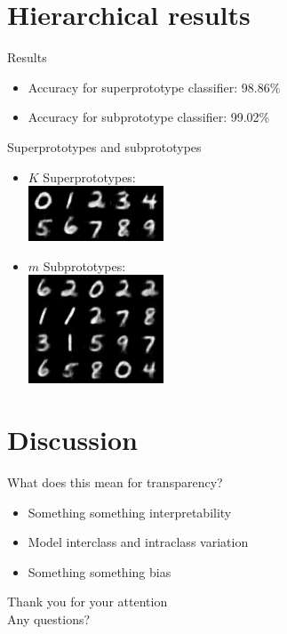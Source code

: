 \documentclass{beamer}[169]
\begin{document}
\section{Hierarchical results}
\begin{frame}{Results}
\begin{itemize}
    \item Accuracy for superprototype classifier: 98.86\% %
    \item Accuracy for subprototype classifier:  99.02\%
\end{itemize}
\end{frame}
\begin{frame}{Superprototypes and subprototypes}
\begin{itemize}
 \item $K$ Superprototypes:\\   \includegraphics[scale=0.9]{img/hier42prot1499.png}

 \item $m$ Subprototypes: \\   \includegraphics[scale=0.9]{img/hier42subprot1499.png}
\end{itemize}
\end{frame}

\section{Discussion}
\begin{frame}{What does this mean for transparency? }
    \begin{itemize}
        \item Something something interpretability
        \item Model interclass and intraclass variation
        \item Something something bias
    \end{itemize}
\end{frame}

\begin{frame}[plain]

\advance\textwidth2cm
\hsize\textwidth
\columnwidth\textwidth
\huge
\alert{Thank you for your attention}\pause \\
Any questions?
\end{frame}
\end{document}
